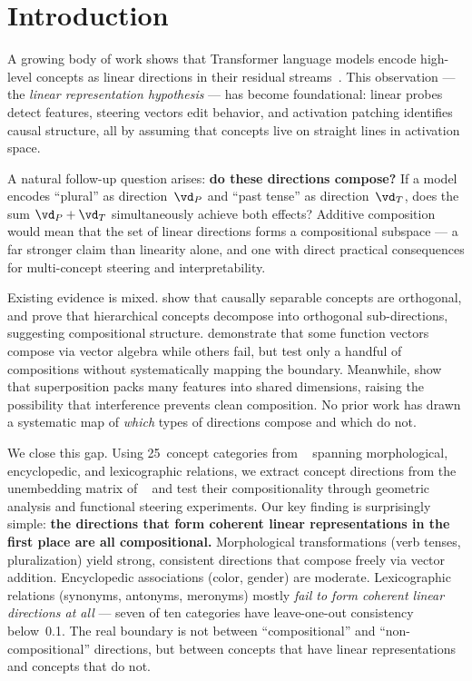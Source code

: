 \section{Introduction}
\label{sec:intro}

A growing body of work shows that Transformer language models encode high-level concepts as linear directions in their residual streams~\citep{park2024linear,zou2023representation,todd2024function}.
This observation --- the \emph{linear representation hypothesis} --- has become foundational: linear probes detect features, steering vectors edit behavior, and activation patching identifies causal structure, all by assuming that concepts live on straight lines in activation space.

A natural follow-up question arises: {\bf do these directions compose?}
If a model encodes ``plural'' as direction~$\vd_P$ and ``past tense'' as direction~$\vd_T$, does the sum $\vd_P + \vd_T$ simultaneously achieve both effects?
Additive composition would mean that the set of linear directions forms a compositional subspace --- a far stronger claim than linearity alone, and one with direct practical consequences for multi-concept steering and interpretability.

Existing evidence is mixed.
\citet{park2024linear} show that causally separable concepts are orthogonal, and \citet{park2024geometry} prove that hierarchical concepts decompose into orthogonal sub-directions, suggesting compositional structure.
\citet{todd2024function} demonstrate that some function vectors compose via vector algebra while others fail, but test only a handful of compositions without systematically mapping the boundary.
Meanwhile, \citet{elhage2022superposition} show that superposition packs many features into shared dimensions, raising the possibility that interference prevents clean composition.
No prior work has drawn a systematic map of \emph{which} types of directions compose and which do not.

We close this gap.
Using 25~concept categories from \bats~\citep{gladkova2016analogy} spanning morphological, encyclopedic, and lexicographic relations, we extract concept directions from the unembedding matrix of \pythia~\citep{biderman2023pythia} and test their compositionality through geometric analysis and functional steering experiments.
Our key finding is surprisingly simple: {\bf the directions that form coherent linear representations in the first place are all compositional.}
Morphological transformations (verb tenses, pluralization) yield strong, consistent directions that compose freely via vector addition.
Encyclopedic associations (color, gender) are moderate.
Lexicographic relations (synonyms, antonyms, meronyms) mostly \emph{fail to form coherent linear directions at all} --- seven of ten categories have leave-one-out consistency below~0.1.
The real boundary is not between ``compositional'' and ``non-compositional'' directions, but between concepts that have linear representations and concepts that do not.

